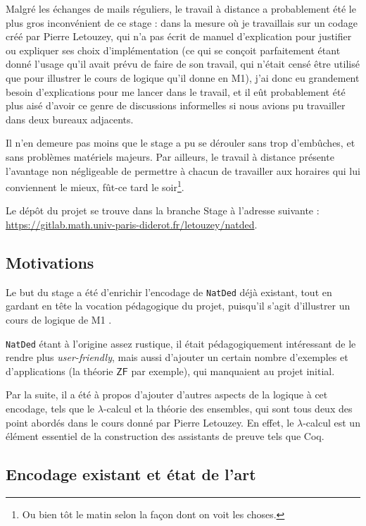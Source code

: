\documentclass[a4paper]{article}
\newcommand{\ZF}{\mathsf{ZF}}
\theoremstyle{remark}
\theoremstyle{remark}
\theoremstyle{remark}
\theoremstyle{definition}
\theoremstyle{definition}
\theoremstyle{definition}
\begin{document}
Malgré les échanges de mails réguliers, le travail à distance a probablement été le plus gros inconvénient de ce stage : dans la mesure où je travaillais sur un codage créé par Pierre Letouzey, qui n'a pas écrit de manuel d'explication pour justifier ou expliquer ses choix d'implémentation (ce qui se conçoit parfaitement étant donné l'usage qu'il avait prévu de faire de son travail, qui n'était censé être utilisé que pour illustrer le cours de logique qu'il donne en M1), j'ai donc eu grandement besoin d'explications pour me lancer dans le travail, et il eût probablement été plus aisé d'avoir ce genre de discussions informelles si nous avions pu travailler dans deux bureaux adjacents.

Il n'en demeure pas moins que le stage a pu se dérouler sans trop d'embûches, et sans problèmes matériels majeurs. Par ailleurs, le travail à distance présente l'avantage non négligeable de permettre à chacun de travailler aux horaires qui lui conviennent le mieux, fût-ce tard le soir\footnote{Ou bien tôt le matin selon la façon dont on voit les choses.}.

Le dépôt du projet se trouve dans la branche \og Stage \fg{} à l'adresse suivante : \url{https://gitlab.math.univ-paris-diderot.fr/letouzey/natded}.

\subsection{Motivations}

Le but du stage a été d'enrichir l'encodage de \verb+NatDed+ déjà existant, tout en gardant en tête la vocation pédagogique du projet, puisqu'il s'agit d'illustrer un cours de logique de M1 \cite{poly}.

\verb+NatDed+ étant à l'origine assez rustique, il était pédagogiquement intéressant de le rendre plus \textit{user-friendly}, mais aussi d'ajouter un certain nombre d'exemples et d'applications (la théorie $\ZF$ par exemple), qui manquaient au projet initial.

Par la suite, il a été à propos d'ajouter d'autres aspects de la logique à cet encodage, tels que le $\lambda$-calcul et la théorie des ensembles, qui sont tous deux des point abordés dans le cours donné par Pierre Letouzey. En effet, le $\lambda$-calcul est un élément essentiel de la construction des assistants de preuve tels que Coq.

\subsection{Encodage existant et état de l'art}
\end{document}
